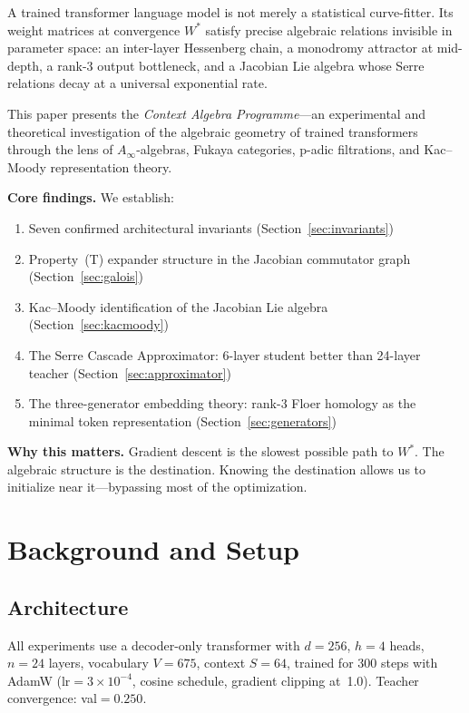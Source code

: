 \documentclass[11pt,a4paper]{article}
\begin{document}
A trained transformer language model is not merely a statistical curve-fitter.
Its weight matrices at convergence $W^*$ satisfy precise algebraic relations
invisible in parameter space: an inter-layer Hessenberg chain, a monodromy
attractor at mid-depth, a rank-3 output bottleneck, and a Jacobian Lie algebra
whose Serre relations decay at a universal exponential rate.

This paper presents the \emph{Context Algebra Programme}---an experimental
and theoretical investigation of the algebraic geometry of trained transformers
through the lens of $A_\infty$-algebras, Fukaya categories, p-adic filtrations,
and Kac--Moody representation theory.

\textbf{Core findings.} We establish:
\begin{enumerate}
  \item Seven confirmed architectural invariants (Section~\ref{sec:invariants})
  \item Property~(T) expander structure in the Jacobian commutator graph
        (Section~\ref{sec:galois})
  \item Kac--Moody identification of the Jacobian Lie algebra
        (Section~\ref{sec:kacmoody})
  \item The Serre Cascade Approximator: 6-layer student better than
        24-layer teacher (Section~\ref{sec:approximator})
  \item The three-generator embedding theory: rank-3 Floer homology as
        the minimal token representation (Section~\ref{sec:generators})
\end{enumerate}

\textbf{Why this matters.} Gradient descent is the slowest possible path
to $W^*$.  The algebraic structure is the destination.  Knowing the destination
allows us to initialize near it---bypassing most of the optimization.

\section{Background and Setup}

\subsection{Architecture}

All experiments use a decoder-only transformer with $d{=}256$, $h{=}4$ heads,
$n{=}24$ layers, vocabulary $V{=}675$, context $S{=}64$, trained for 300 steps
with AdamW ($\text{lr}{=}3{\times}10^{-4}$, cosine schedule, gradient clipping
at~1.0).  Teacher convergence: val${=}0.250$.
\end{document}
